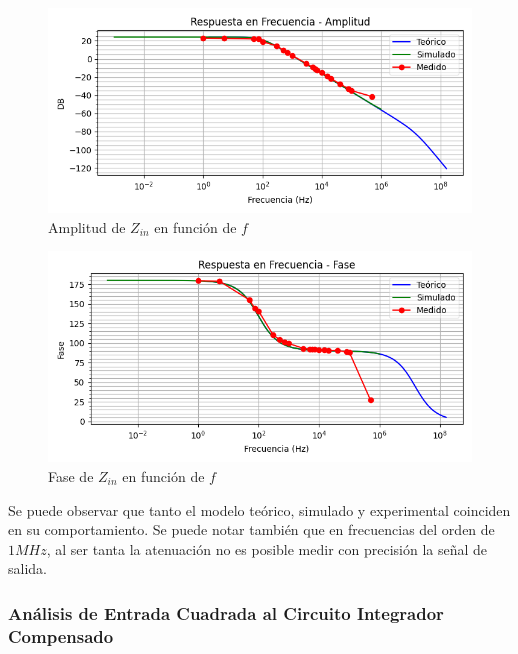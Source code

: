 \begin{figure}[H]
    \centering 
    \includegraphics [scale=1] {../Ejercicio3-CircuitoIntegradoresyDerivadores/Imagenes/transferencia-comparativo-todo-amplitud.png} 
    \caption{Amplitud de $Z_{in}$ en función de $f$}
    \label{fig:emptyPlotTool}
\end{figure}

\begin{figure}[H]
    \centering 
    \includegraphics [scale=1] {../Ejercicio3-CircuitoIntegradoresyDerivadores/Imagenes/transferencia-comparativo-todo-fase.png} 
    \caption{Fase de $Z_{in}$ en función de $f$ }
    \label{fig:emptyPlotTool}
\end{figure}

Se puede observar que tanto el modelo teórico, simulado y experimental coinciden en su comportamiento. Se puede notar también que
en frecuencias del orden de $1MHz$, al ser tanta la atenuación no es posible medir con precisión la señal de salida.

\subsubsection{Análisis de Entrada Cuadrada al Circuito Integrador Compensado}

